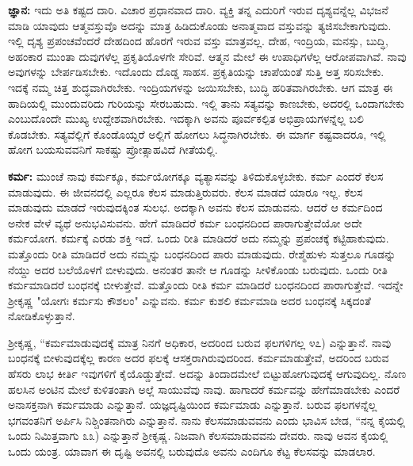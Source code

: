 \textbf{ಜ್ಞಾನ:} ಇದು ಅತಿ ಕಷ್ಟದ ದಾರಿ. ವಿಚಾರ ಪ್ರಧಾನವಾದ ದಾರಿ. ವ್ಯಕ್ತಿ ತನ್ನ ಎದುರಿಗೆ ಇರುವ ದೃಶ್ಯವನ್ನೆಲ್ಲ ವಿಭಜನೆ ಮಾಡಿ ಯಾವುದು ಆತ್ಮವಸ್ತುವೊ ಅದನ್ನು ಮಾತ್ರ ಹಿಡಿದುಕೊಂಡು ಅನಾತ್ಮವಾದ ವಸ್ತುವನ್ನು ತ್ಯಜಿಸಬೇಕಾಗುವುದು. ಇಲ್ಲಿ ದೃಶ್ಯ ಪ್ರಪಂಚವೆಂದರೆ ದೇಹದಿಂದ ಹೊರಗೆ ಇರುವ ವಸ್ತು ಮಾತ್ರವಲ್ಲ. ದೇಹ, ಇಂದ್ರಿಯ, ಮನಸ್ಸು, ಬುದ್ಧಿ, ಅಹಂಕಾರ ಮುಂತಾ ದುವುಗಳೆಲ್ಲ ಪ್ರಕೃತಿಯೊಳಗೇ ಸೇರಿವೆ. ಆತ್ಮನ ಮೇಲೆ ಈ ಉಪಾಧಿಗಳೆಲ್ಲ ಆರೋಪವಾಗಿವೆ. ನಾವು ಅವುಗಳನ್ನು ಬೇರ್ಪಡಿಸಬೇಕು. ಇದೊಂದು ದೊಡ್ಡ ಸಾಹಸ. ಪ್ರಕೃತಿಯನ್ನು ಚಾಪೆಯಂತೆ ಸುತ್ತಿ ಅತ್ತ ಸರಿಸಬೇಕು. ಇದಕ್ಕೆ ನಮ್ಮ ಚಿತ್ತ ಶುದ್ಧವಾಗಿರಬೇಕು. ಇಂದ್ರಿಯಗಳನ್ನು ಜಯಿಸಬೇಕು, ಬುದ್ಧಿ ಹರಿತವಾಗಿರಬೇಕು. ಆಗ ಮಾತ್ರ ಈ ಹಾದಿಯಲ್ಲಿ ಮುಂದುವರಿದು ಗುರಿಯನ್ನು ಸೇರಬಹುದು. ಇಲ್ಲಿ ತಾನು ಸತ್ಯವನ್ನು ಕಾಣಬೇಕು, ಅದರಲ್ಲಿ ಒಂದಾಗಬೇಕು ಎಂಬುದೊಂದೇ ಮುಖ್ಯ ಉದ್ದೇಶವಾಗಿರಬೇಕು. ಇದಕ್ಕಾಗಿ ಅವನು ಪೂರ್ವಕಲ್ಪಿತ ಅಭಿಪ್ರಾಯಗಳನ್ನೆಲ್ಲ ಬಲಿ ಕೊಡಬೇಕು. ಸತ್ಯವೆಲ್ಲಿಗೆ ಕೊಂಡೊಯ್ದರೆ ಅಲ್ಲಿಗೆ ಹೋಗಲು ಸಿದ್ಧನಾಗಿರಬೇಕು. ಈ ಮಾರ್ಗ ಕಷ್ಟವಾದರೂ, ಇಲ್ಲಿ ಹೋಗ ಬಯಸುವವನಿಗೆ ಸಾಕಷ್ಚು ಪ್ರೋತ್ಸಾಹವಿದೆ ಗೀತೆಯಲ್ಲಿ.

\textbf{ಕರ್ಮ:} ಮುಂಚೆ ನಾವು ಕರ್ಮಕ್ಕೂ, ಕರ್ಮಯೋಗಕ್ಕೂ ವ್ಯತ್ಯಾಸವನ್ನು ತಿಳಿದುಕೊಳ್ಳಬೇಕು. ಕರ್ಮ ಎಂದರೆ ಕೆಲಸ ಮಾಡುವುದು. ಈ ಜೀವನದಲ್ಲಿ ಎಲ್ಲರೂ ಕೆಲಸ ಮಾಡುತ್ತಿರುವರು. ಕೆಲಸ ಮಾಡದೆ ಯಾರೂ ಇಲ್ಲ. ಕೆಲಸ ಮಾಡುವುದು ಮಾಡದೆ ಇರುವುದಕ್ಕಿಂತ ಸುಲಭ. ಅದಕ್ಕಾಗಿ ಅವನು ಕೆಲಸ ಮಾಡುವನು. ಆದರೆ ಆ ಕರ್ಮದಿಂದ ಅನೇಕ ವೇಳೆ ವ್ಯಥೆ ಅನುಭವಿಸುವನು. ಹೇಗೆ ಮಾಡಿದರೆ ಕರ್ಮ ಬಂಧನದಿಂದ ಪಾರಾಗುತ್ತೇವೆಯೋ ಅದೇ ಕರ್ಮಯೋಗ. ಕರ್ಮಕ್ಕೆ ಎರಡು ಶಕ್ತಿ ಇದೆ. ಒಂದು ರೀತಿ ಮಾಡಿದರೆ ಅದು ನಮ್ಮನ್ನು ಪ್ರಪಂಚಕ್ಕೆ ಕಟ್ಟಿಹಾಕುವುದು. ಮತ್ತೊಂದು ರೀತಿ ಮಾಡಿದರೆ ಅದು ನಮ್ಮನ್ನು ಬಂಧನದಿಂದ ಪಾರು ಮಾಡುವುದು. ರೇಶ್ಮೆಹುಳು ಸುತ್ತಲೂ ಗೂಡನ್ನು ನೆಯ್ದು ಅದರ ಬಲೆಯೊಳಗೆ ಬೀಳುವುದು. ಅನಂತರ ತಾನೇ ಆ ಗೂಡನ್ನು ಸೀಳಿಕೊಂಡು ಬರುವುದು. ಒಂದು ರೀತಿ ಕರ್ಮಮಾಡಿದರೆ ಬಂಧನಕ್ಕೆ ಬೀಳುತ್ತೇವೆ. ಮತ್ತೊಂದು ರೀತಿ ಕರ್ಮ ಮಾಡಿದರೆ ಬಂಧನದಿಂದ ಪಾರಾಗುತ್ತೇವೆ. ಇದನ್ನೇ ಶ‍್ರೀಕೃಷ್ಣ "ಯೋಗಃ ಕರ್ಮಸು ಕೌಶಲಂ" ಎನ್ನುವನು. ಕರ್ಮ ಕುಶಲಿ ಕರ್ಮಮಾಡಿ ಅದರ ಬಂಧನಕ್ಕೆ ಸಿಕ್ಕದಂತೆ ನೋಡಿಕೊಳ್ಳುತ್ತಾನೆ.

ಶ‍್ರೀಕೃಷ್ಣ, “ಕರ್ಮಮಾಡುವುದಕ್ಕೆ ಮಾತ್ರ ನಿನಗೆ ಅಧಿಕಾರ, ಅದರಿಂದ ಬರುವ ಫಲಗಳಿಗಲ್ಲ ೪೭) ಎನ್ನುತ್ತಾನೆ. ನಾವು ಬಂಧನಕ್ಕೆ ಬೀಳುವುದಕ್ಕೆಲ್ಲ ಕಾರಣ ಅದರ ಫಲಕ್ಕೆ ಆಸಕ್ತರಾಗಿರುವುದರಿಂದ. ಕರ್ಮಮಾಡುತ್ತೇವೆ, ಅದರಿಂದ ಬರುವ ಹೆಸರು ಲಾಭ ಕೀರ್ತಿ ಇವುಗಳಿಗೆ ಕೈಯೊಡ್ಡುತ್ತೇವೆ. ಅದನ್ನು ತಿಂದಾದಮೇಲೆ ಬಿಟ್ಟುಹೋಗುವುದಕ್ಕೆ ಆಗುವುದಿಲ್ಲ. ನೊಣ ಹಲಸಿನ ಅಂಟಿನ ಮೇಲೆ ಕುಳಿತಂತಾಗಿ ಅಲ್ಲೆ ಸಾಯುವೆವು ನಾವು. ಹಾಗಾದರೆ ಕರ್ಮವನ್ನು ಹೇಗೆ\break ಮಾಡಬೇಕು ಎಂದರೆ ಅನಾಸಕ್ತನಾಗಿ ಕರ್ಮಮಾಡು ಎನ್ನುತ್ತಾನೆ. ಯಜ್ಞದೃಷ್ಟಿಯಿಂದ ಕರ್ಮ\-ಮಾಡು ಎನ್ನುತ್ತಾನೆ. ಬರುವ ಫಲಗಳನ್ನೆಲ್ಲ ಭಗವಂತನಿಗೆ ಅರ್ಪಿಸಿ ನಿಶ್ಚಿಂತನಾಗಿರು ಎನ್ನುತ್ತಾನೆ. ನಾನು ಕೆಲಸಮಾಡುವವನು ಎಂದು ಭಾವಿಸ ಬೇಡ, “ನನ್ನ ಕೈಯಲ್ಲಿ ಒಂದು ನಿಮಿತ್ತವಾಗು ೩೩) ಎನ್ನುತ್ತಾನೆ ಶ‍್ರೀಕೃಷ್ಣ. ನಿಜವಾಗಿ ಕೆಲಸಮಾಡುವವನು ದೇವರು. ನಾವು ಅವನ ಕೈಯಲ್ಲಿ ಒಂದು ಯಂತ್ರ. ಯಾವಾಗ ಈ ದೃಷ್ಟಿ ಅವನಲ್ಲಿ ಬರುವುದೊ ಅವನು ಎಂದಿಗೂ ಕೆಟ್ಟ ಕೆಲಸವನ್ನು ಮಾಡಲಾರ.

